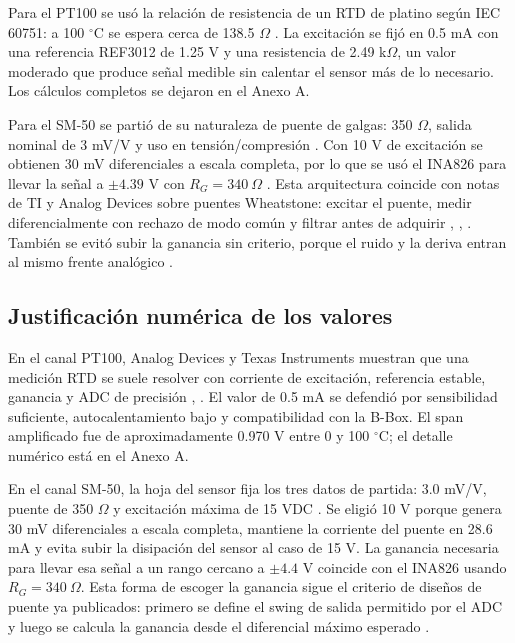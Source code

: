 \documentclass[conference]{IEEEtran}
\begin{document}
Para el PT100 se usó la relación de resistencia de un RTD de platino según IEC 60751: a 100 $^\circ$C se espera cerca de 138.5 $\Omega$ \cite{bipm}. La excitación se fijó en 0.5 mA con una referencia REF3012 de 1.25 V \cite{ref30} y una resistencia de 2.49 k$\Omega$, un valor moderado que produce señal medible sin calentar el sensor más de lo necesario. Los cálculos completos se dejaron en el Anexo A.

Para el SM-50 se partió de su naturaleza de puente de galgas: 350 $\Omega$, salida nominal de 3 mV/V y uso en tensión/compresión \cite{interface}. Con 10 V de excitación se obtienen 30 mV diferenciales a escala completa, por lo que se usó el INA826 para llevar la señal a $\pm4.39$ V con $R_G=340~\Omega$ \cite{ina826}. Esta arquitectura coincide con notas de TI y Analog Devices sobre puentes Wheatstone: excitar el puente, medir diferencialmente con rechazo de modo común y filtrar antes de adquirir \cite{sloa034}, \cite{sboa247}, \cite{an43}. También se evitó subir la ganancia sin criterio, porque el ruido y la deriva entran al mismo frente analógico \cite{an96}.

\subsection{Justificación numérica de los valores}

En el canal PT100, Analog Devices y Texas Instruments muestran que una medición RTD se suele resolver con corriente de excitación, referencia estable, ganancia y ADC de precisión \cite{adi_rtd}, \cite{ti_rtd}. El valor de 0.5 mA se defendió por sensibilidad suficiente, autocalentamiento bajo y compatibilidad con la B-Box. El span amplificado fue de aproximadamente 0.970 V entre 0 y 100 $^\circ$C; el detalle numérico está en el Anexo A.

En el canal SM-50, la hoja del sensor fija los tres datos de partida: 3.0 mV/V, puente de 350 $\Omega$ y excitación máxima de 15 VDC \cite{interface}. Se eligió 10 V porque genera 30 mV diferenciales a escala completa, mantiene la corriente del puente en 28.6 mA y evita subir la disipación del sensor al caso de 15 V. La ganancia necesaria para llevar esa señal a un rango cercano a $\pm4.4$ V coincide con el INA826 usando $R_G=340~\Omega$. Esta forma de escoger la ganancia sigue el criterio de diseños de puente ya publicados: primero se define el swing de salida permitido por el ADC y luego se calcula la ganancia desde el diferencial máximo esperado \cite{sboa247}.
\end{document}
